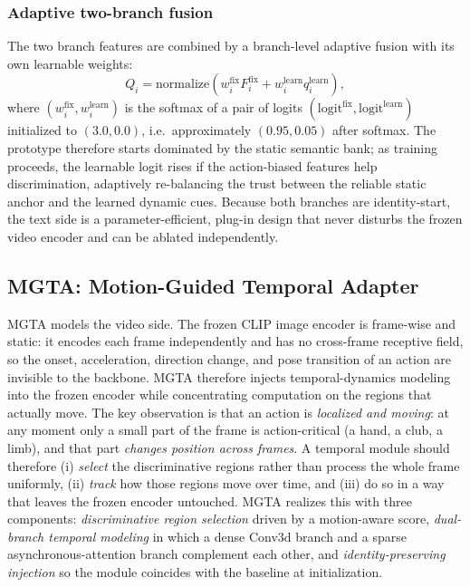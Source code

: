 \subsubsection{Adaptive two-branch fusion}
The two branch features are combined by a branch-level adaptive fusion with its own learnable weights:
\begin{equation}
  Q_i = \mathrm{normalize}\!\left( w^{\text{fix}}_i F^{\text{fix}}_i + w^{\text{learn}}_i q^{\text{learn}}_i \right),
  \label{eq:amtf-branch-fuse}
\end{equation}
where $(w^{\text{fix}}_i, w^{\text{learn}}_i)$ is the softmax of a pair of logits $(\mathrm{logit}^{\text{fix}}, \mathrm{logit}^{\text{learn}})$ initialized to $(3.0, 0.0)$, i.e.\ approximately $(0.95, 0.05)$ after softmax.
The prototype therefore starts dominated by the static semantic bank; as training proceeds, the learnable logit rises if the action-biased features help discrimination, adaptively re-balancing the trust between the reliable static anchor and the learned dynamic cues.
Because both branches are identity-start, the text side is a parameter-efficient, plug-in design that never disturbs the frozen video encoder and can be ablated independently.

\subsection{MGTA: Motion-Guided Temporal Adapter}
\label{sec:sata}
MGTA models the video side.
The frozen CLIP image encoder is frame-wise and static: it encodes each frame independently and has no cross-frame receptive field, so the onset, acceleration, direction change, and pose transition of an action are invisible to the backbone.
MGTA therefore injects temporal-dynamics modeling into the frozen encoder while concentrating computation on the regions that actually move.
The key observation is that an action is \emph{localized and moving}: at any moment only a small part of the frame is action-critical (a hand, a club, a limb), and that part \emph{changes position across frames}.
A temporal module should therefore (i) \emph{select} the discriminative regions rather than process the whole frame uniformly, (ii) \emph{track} how those regions move over time, and (iii) do so in a way that leaves the frozen encoder untouched. MGTA realizes this with three components: \emph{discriminative region selection} driven by a motion-aware score, \emph{dual-branch temporal modeling} in which a dense Conv3d branch and a sparse asynchronous-attention branch complement each other, and \emph{identity-preserving injection} so the module coincides with the baseline at initialization.

